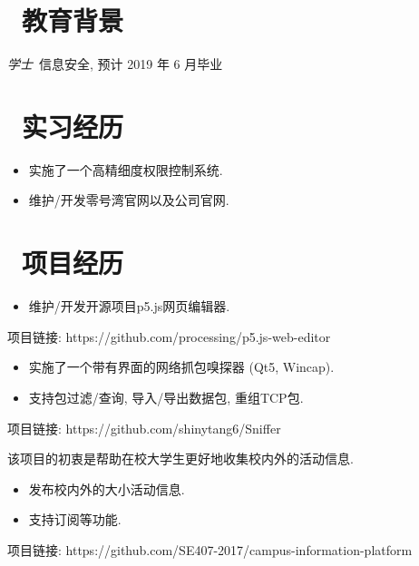 \documentclass{resume}
\begin{document}


 
\section{\faGraduationCap\  教育背景}
\textit{学士}\ 信息安全, 预计 2019 年 6 月毕业

\section{\faBuilding\ 实习经历}
\role{暑期实习}{软件开发实习生}
\begin{itemize}
  \item 实施了一个高精细度权限控制系统.
  \item 维护/开发零号湾官网以及公司官网.
\end{itemize}

\section{\faUsers\ 项目经历}
\begin{itemize}
  \item 维护/开发开源项目p5.js网页编辑器.
\end{itemize}
项目链接: https://github.com/processing/p5.js-web-editor

\begin{itemize}
  \item 实施了一个带有界面的网络抓包嗅探器 (Qt5, Wincap).
  \item 支持包过滤/查询, 导入/导出数据包, 重组TCP包.
\end{itemize}
项目链接: https://github.com/shinytang6/Sniffer


该项目的初衷是帮助在校大学生更好地收集校内外的活动信息.
\begin{itemize}
  \item 发布校内外的大小活动信息.
  \item 支持订阅等功能.
\end{itemize}
项目链接: https://github.com/SE407-2017/campus-information-platform
\end{document}
